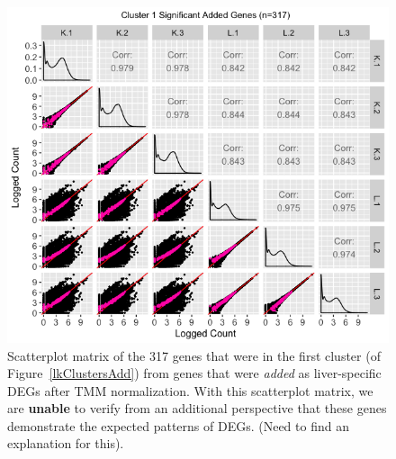\documentclass{article}
\begin{document}
\null
\begin{figure}[t!]
\centerline{\includegraphics[width=1\columnwidth]{../MakeFigures/lkClustersAddSM.jpg}}
\caption{Scatterplot matrix of the 317 genes that were in the first cluster (of Figure~\ref{lkClustersAdd}) from genes that were \textit{added} as liver-specific DEGs after TMM normalization. With this scatterplot matrix, we are \textbf{unable} to verify from an additional perspective that these genes demonstrate the expected patterns of DEGs. (Need to find an explanation for this).
\label{lkClustersAddSM}}
\end{figure}
\end{document}

